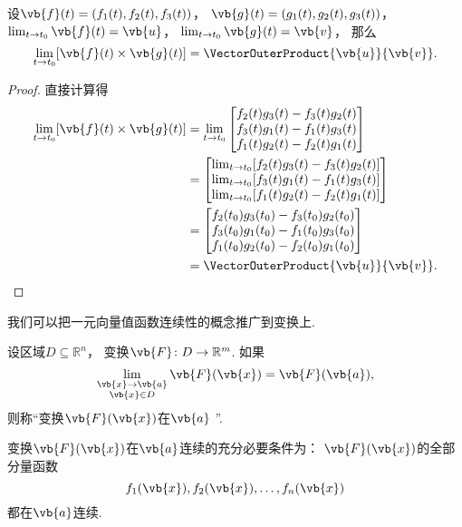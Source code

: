 \begin{theorem}
设\(\vb{f}(t) = (f_1(t),f_2(t),f_3(t))\)，
\(\vb{g}(t) = (g_1(t),g_2(t),g_3(t))\)，
\(\lim_{t \to t_0} \vb{f}(t) = \vb{u}\)，
\(\lim_{t \to t_0} \vb{g}(t) = \vb{v}\)，
那么\[
	\lim_{t \to t_0} [\vb{f}(t) \times \vb{g}(t)]
	= \VectorOuterProduct{\vb{u}}{\vb{v}}.
\]
\begin{proof}
直接计算得\begin{align*}
	\lim_{t \to t_0} [\vb{f}(t) \times \vb{g}(t)]
	&= \lim_{t \to t_0} \begin{bmatrix}
		f_2(t) g_3(t) - f_3(t) g_2(t) \\
		f_3(t) g_1(t) - f_1(t) g_3(t) \\
		f_1(t) g_2(t) - f_2(t) g_1(t) \\
	\end{bmatrix} \\
	&= \begin{bmatrix}
		\lim_{t \to t_0} [f_2(t) g_3(t) - f_3(t) g_2(t)] \\
		\lim_{t \to t_0} [f_3(t) g_1(t) - f_1(t) g_3(t)] \\
		\lim_{t \to t_0} [f_1(t) g_2(t) - f_2(t) g_1(t)] \\
	\end{bmatrix} \\
	&= \begin{bmatrix}
		f_2(t_0) g_3(t_0) - f_3(t_0) g_2(t_0) \\
		f_3(t_0) g_1(t_0) - f_1(t_0) g_3(t_0) \\
		f_1(t_0) g_2(t_0) - f_2(t_0) g_1(t_0) \\
	\end{bmatrix} \\
	&= \VectorOuterProduct{\vb{u}}{\vb{v}}.
	\qedhere
\end{align*}
\end{proof}
\end{theorem}

我们可以把一元向量值函数连续性的概念推广到变换上.
\begin{definition}
设区域\(D \subseteq \mathbb{R}^n\)，
变换\(\vb{F}\colon D \to \mathbb{R}^m\).
如果\[
	\lim_{\substack{
		\vb{x}\to\vb{a} \\
		\vb{x} \in D
	}} \vb{F}(\vb{x})
	= \vb{F}(\vb{a}),
\]
则称“变换\(\vb{F}(\vb{x})\)在\(\vb{a}\) ”.
\end{definition}

\begin{theorem}
变换\(\vb{F}(\vb{x})\)在\(\vb{a}\)连续的充分必要条件为：
\(\vb{F}(\vb{x})\)的全部分量函数\[
	f_1(\vb{x}),f_2(\vb{x}),\dotsc,f_n(\vb{x})
\]都在\(\vb{a}\)连续.
\end{theorem}

